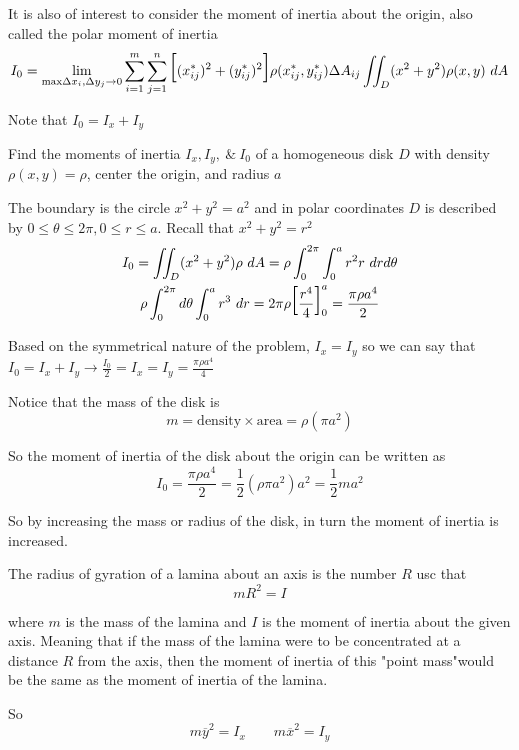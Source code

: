 \documentclass{article}
\begin{document}
  It is also of interest to consider the moment of inertia about the origin, also called the polar moment of inertia
  \[
    I_0 = \lim_{\text{max} \Delta x_{i}, \Delta y_j \to 0} \sum^{m}_{i=1} \sum^{n}_{j=1} \text{\huge{[}} (x^{*}_{ij})^{2}+(y^{*}_{ij})^{2} \text{\huge{]}} \rho(x^{*}_{ij}, y^{*}_{ij}) \Delta A_{ij}\\
    \iint_D (x^{2}+y^{2}) \rho(x,y)~dA 
  \]

  Note that $ I_0 = I_x + I_y $ 
  
  Find the moments of inertia $ I_x, I_y, ~\&~ I_0 $ of a homogeneous disk $ D $ with density $ \rho(x,y)=\rho $, center the origin, and radius $ a $

  The boundary is the circle $ x^{2} + y^{2}=a^{2} $ and in polar coordinates $ D $  is described by $ 0 \le \theta \le 2\pi, 0 \le r \le a $. Recall that $ x^{2}+y^{2}=r^{2} $ 
  \[
    \begin{gathered}
    I_0 = \iint_D (x^{2}+y^{2})\rho~dA = \rho \int^{2\pi}_{0} \int^{a}_{0} r^{2}r ~drd\theta\\
    \rho \int^{2\pi}_{0} d\theta \int^{a}_{0} r^{3} ~ dr = 2\pi \rho \text{\huge{[}} \frac{r^{4}}{4} \text{\huge{]}}^{a}_0=\frac{\pi\rho a^{4}}{2} 
    \end{gathered}
  \]

  Based on the symmetrical nature of the problem, $ I_x=I_y $ so we can say that $ I_0=I_x+I_y \to \frac{I_0}{2}=I_x=I_y=\frac{\pi\rho a^{4}}{4} $

  Notice that the mass of the disk is
  \[
    m = \text{density} \times \text{area} = \rho(\pi a^{2})
  \]

  So the moment of inertia of the disk about the origin can be written as
  \[
    I_0 = \frac{\pi\rho a^{4}}{2}=\frac{1}{2}(\rho \pi a^{2})a^{2} = \frac{1}{2}ma^{2}
  \]

  So by increasing the mass or radius of the disk, in turn the moment of inertia is increased.

  The radius of gyration of a lamina about an axis is the number $ R $ usc that
  \[
    mR^{2}=I
  \]
  
  where $ m $ is the mass of the lamina and $ I $ is the moment of inertia about the given axis. Meaning that if the mass of the lamina were to be concentrated at a distance $ R $ from the axis, then the moment of inertia of this "point mass"would be the same as the moment of inertia of the lamina.

  So
  \[
    m \overline{y}^{2}=I_x \qquad m \overline{x}^{2}=I_y
  \]
\end{document}
